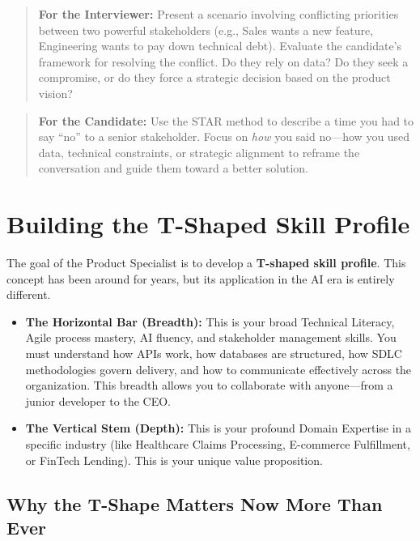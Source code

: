 \begin{quote}
\textbf{For the Interviewer:} Present a scenario involving conflicting
priorities between two powerful stakeholders (e.g., Sales wants a new
feature, Engineering wants to pay down technical debt). Evaluate the
candidate's framework for resolving the conflict. Do they rely on data?
Do they seek a compromise, or do they force a strategic decision based
on the product vision?
\end{quote}

\begin{quote}
\textbf{For the Candidate:} Use the STAR method to describe a time you
had to say ``no'' to a senior stakeholder. Focus on \emph{how} you said
no---how you used data, technical constraints, or strategic alignment to
reframe the conversation and guide them toward a better solution.
\end{quote}

\bigskip

\section{Building the T-Shaped Skill
Profile}\label{building-the-t-shaped-skill-profile}

The goal of the Product Specialist is to develop a \textbf{T-shaped
skill profile}. This concept has been around for years, but its
application in the AI era is entirely different.

\begin{itemize}
\tightlist
\item
  \textbf{The Horizontal Bar (Breadth):} This is your broad Technical
  Literacy, Agile process mastery, AI fluency, and stakeholder
  management skills. You must understand how APIs work, how databases
  are structured, how SDLC methodologies govern delivery, and how to
  communicate effectively across the organization. This breadth allows
  you to collaborate with anyone---from a junior developer to the CEO.
\item
  \textbf{The Vertical Stem (Depth):} This is your profound Domain
  Expertise in a specific industry (like Healthcare Claims Processing,
  E-commerce Fulfillment, or FinTech Lending). This is your unique value
  proposition.
\end{itemize}

\subsection{Why the T-Shape Matters Now More Than
Ever}\label{why-the-t-shape-matters-now-more-than-ever}

